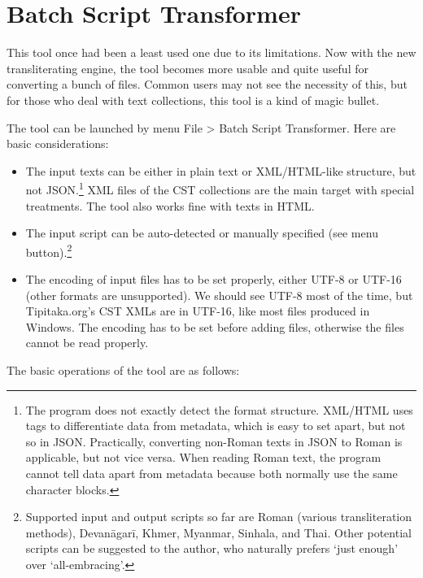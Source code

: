 \chapter{Batch Script Transformer}

This tool once had been a least used one due to its limitations. Now with the new transliterating engine, the tool becomes more usable and quite useful for converting a bunch of files. Common users may not see the necessity of this, but for those who deal with text collections, this tool is a kind of magic bullet.

The tool can be launched by menu File > {\faSix {}} Batch Script Transformer. Here are basic considerations:

\begin{itemize}
\item The input texts can be either in plain text or XML/HTML-like structure, but not JSON.\footnote{The program does not exactly detect the format structure. XML/HTML uses tags to differentiate data from metadata, which is easy to set apart, but not so in JSON. Practically, converting non-Roman texts in JSON to Roman is applicable, but not vice versa. When reading Roman text, the program cannot tell data apart from metadata because both normally use the same character blocks.} XML files of the CST collections are the main target with special treatments. The tool also works fine with texts in HTML.
\item The input script can be auto-detected or manually specified (see {\faSix {}} menu button).\footnote{Supported input and output scripts so far are Roman (various transliteration methods), Devanāgarī, Khmer, Myanmar, Sinhala, and Thai. Other potential scripts can be suggested to the author, who naturally prefers `just enough' over `all-embracing'.}
\item The encoding of input files has to be set properly, either UTF-8 or UTF-16 (other formats are unsupported). We should see UTF-8 most of the time, but Tipitaka.org's CST XMLs are in UTF-16, like most files produced in Windows. The encoding has to be set before adding files, otherwise the files cannot be read properly.
\end{itemize}


The basic operations of the tool are as follows: 

